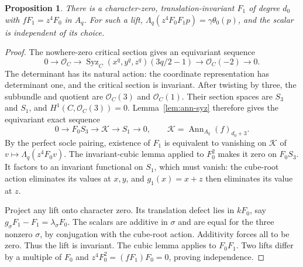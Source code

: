 \documentclass[11pt,a4paper,reqno]{amsart}
\numberwithin{equation}{section}
\theoremstyle{plain}
\newtheorem{proposition}[theorem]{Proposition}
\theoremstyle{definition}
\theoremstyle{remark}
\DeclareMathOperator{\Ann}{Ann}
\DeclareMathOperator{\Syz}{Syz}
\begin{document}
\begin{proposition}\label{prop:first-lift}
There is a character-zero, translation-invariant $F_1$ of degree $d_0$ with
$fF_1=z^4F_0$ in $A_q$. For such a lift,
$\Lambda_q(z^4F_0F_1p)=\gamma\theta_0(p)$, and the scalar is independent of its choice.
\end{proposition}
\begin{proof}
The nowhere-zero critical section gives an equivariant sequence
\[0\longrightarrow\mathcal O_C\longrightarrow\Syz_C(x^q,y^q,z^q)(3q/2-1)\longrightarrow\mathcal O_C(-2)\longrightarrow0.\]
The determinant has its natural action: the coordinate representation
has determinant one, and the critical section is invariant.
After twisting by three, the subbundle and quotient are
$\mathcal O_C(3)$ and $\mathcal O_C(1)$.
Their section spaces are $S_3$ and $S_1$, and
$H^1(C,\mathcal O_C(3))=0$.
Lemma~\ref{lem:ann-syz} therefore gives the equivariant exact sequence
\[
0\to F_0S_3\to \mathcal K\to S_1\to0,\qquad \mathcal K=\Ann_{A_q}(f)_{d_0+3}.
\]
By the perfect socle pairing, existence of $F_1$ is equivalent to vanishing on
$\mathcal K$ of $v\mapsto\Lambda_q(z^4F_0v)$. The invariant-cubic lemma applied to
$F_0^2$ makes it zero on $F_0S_3$. It factors to an invariant functional on $S_1$,
which must vanish: the cube-root action eliminates its values at $x,y$, and
$g_1(x)=x+z$ then eliminates its value at $z$.

Project any lift onto character zero. Its translation defect lies in $kF_0$, say
$g_\sigma F_1-F_1=\lambda_\sigma F_0$. The scalars are additive in $\sigma$ and are
equal for the three nonzero $\sigma$, by conjugation with the cube-root action.
Additivity forces all to be zero. Thus the lift is invariant. The cubic lemma applies
to $F_0F_1$. Two lifts differ by a multiple of $F_0$ and $z^4F_0^2=(fF_1)F_0=0$,
proving independence.
\end{proof}
\end{document}
